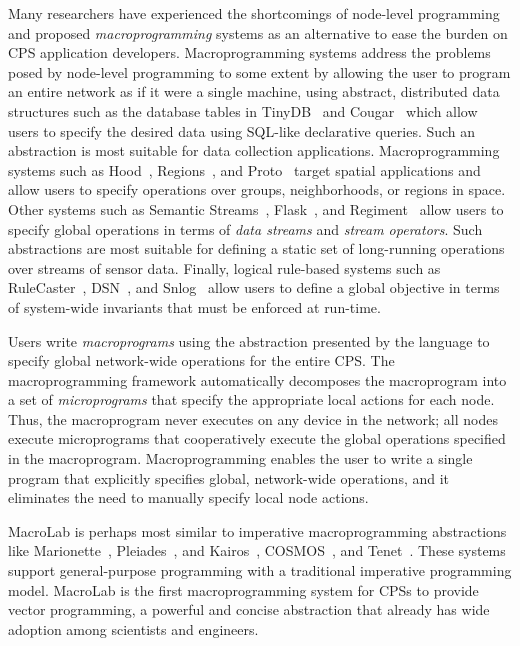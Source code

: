 Many researchers have experienced the shortcomings of node-level programming and
proposed {\em macroprogramming} systems as an alternative to ease the burden on
CPS application developers. Macroprogramming systems address the problems posed
by node-level programming to some extent by allowing the user to program an
entire network as if it were a single machine, using abstract, distributed data
structures such as the database tables in TinyDB~\cite{Madden} and
Cougar~\cite{Yao} which allow users to specify the desired data using SQL-like
declarative queries. Such an abstraction is most suitable for data collection
applications. Macroprogramming systems such as Hood~\cite{Whitehousea},
Regions~\cite{Welsh2004}, and Proto~\cite{Bachrach} target spatial applications
and allow users to specify operations over groups, neighborhoods, or regions in
space. Other systems such as Semantic Streams~\cite{Whitehouse},
Flask~\cite{Mainland}, and Regiment~\cite{Newton} allow users to specify global
operations in terms of {\em data streams} and {\em stream operators}. Such
abstractions are most suitable for defining a static set of long-running
operations over streams of sensor data. Finally, logical rule-based systems such
as RuleCaster~\cite{Bischoff}, DSN~\cite{Chu2006}, and Snlog~\cite{Chu2007}
allow users to define a global objective in terms of system-wide invariants that
must be enforced at run-time.

Users write \emph{macroprograms} using the abstraction presented by the language
to specify global network-wide operations for the entire CPS. The
macroprogramming framework automatically decomposes the macroprogram into a set
of \emph{microprograms} that specify the appropriate local actions for each
node.  Thus, the macroprogram never executes on any device in the network; all
nodes execute microprograms that cooperatively execute the global operations
specified in the macroprogram.  Macroprogramming enables the user to write a
single program that explicitly specifies global, network-wide operations, and it
eliminates the need to manually specify local node actions.

MacroLab is perhaps most similar to imperative macroprogramming abstractions
like Marionette~\cite{Whitehouseb}, Pleiades~\cite{Kothari}, and
Kairos~\cite{Gummadi}, COSMOS~\cite{Awan}, and Tenet~\cite{Gnawali}.  These
systems support general-purpose programming with a traditional imperative
programming model.  MacroLab is the first macroprogramming system for CPSs to
provide vector programming, a powerful and concise abstraction that already has
wide adoption among scientists and engineers.

